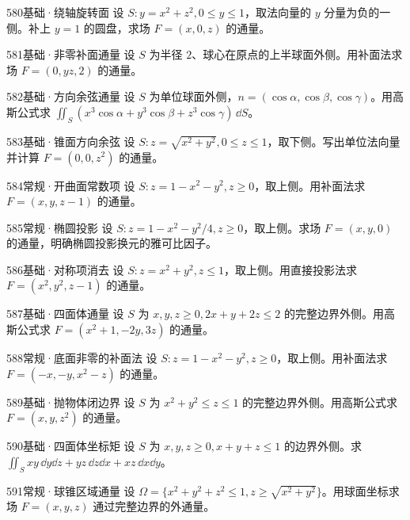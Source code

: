\begin{exercise}{580}{基础·绕轴旋转面}
设 $S:y=x^2+z^2,0\leq y\leq1$，取法向量的 $y$ 分量为负的一侧。补上 $y=1$ 的圆盘，求场 $F=(x,0,z)$ 的通量。
\end{exercise}
\begin{exercise}{581}{基础·非零补面通量}
设 $S$ 为半径 $2$、球心在原点的上半球面外侧。用补面法求场 $F=(0,yz,2)$ 的通量。
\end{exercise}
\begin{exercise}{582}{基础·方向余弦通量}
设 $S$ 为单位球面外侧，$n=(\cos\alpha,\cos\beta,\cos\gamma)$。用高斯公式求 $\iint_S(x^3\cos\alpha+y^3\cos\beta+z^3\cos\gamma)\,\dd S$。
\end{exercise}
\begin{exercise}{583}{基础·锥面方向余弦}
设 $S:z=\sqrt{x^2+y^2},0\leq z\leq1$，取下侧。写出单位法向量并计算 $F=(0,0,z^2)$ 的通量。
\end{exercise}
\begin{exercise}{584}{常规·开曲面常数项}
设 $S:z=1-x^2-y^2,z\geq0$，取上侧。用补面法求 $F=(x,y,z-1)$ 的通量。
\end{exercise}
\begin{exercise}{585}{常规·椭圆投影}
设 $S:z=1-x^2-y^2/4,z\geq0$，取上侧。求场 $F=(x,y,0)$ 的通量，明确椭圆投影换元的雅可比因子。
\end{exercise}
\begin{exercise}{586}{基础·对称项消去}
设 $S:z=x^2+y^2,z\leq1$，取上侧。用直接投影法求 $F=(x^2,y^2,z-1)$ 的通量。
\end{exercise}
\begin{exercise}{587}{基础·四面体通量}
设 $S$ 为 $x,y,z\geq0,2x+y+2z\leq2$ 的完整边界外侧。用高斯公式求 $F=(x^2+1,-2y,3z)$ 的通量。
\end{exercise}
\begin{exercise}{588}{常规·底面非零的补面法}
设 $S:z=1-x^2-y^2,z\geq0$，取上侧。用补面法求 $F=(-x,-y,x^2-z)$ 的通量。
\end{exercise}
\begin{exercise}{589}{基础·抛物体闭边界}
设 $S$ 为 $x^2+y^2\leq z\leq1$ 的完整边界外侧。用高斯公式求 $F=(x,y,z^2)$ 的通量。
\end{exercise}
\begin{exercise}{590}{基础·四面体坐标矩}
设 $S$ 为 $x,y,z\geq0,x+y+z\leq1$ 的边界外侧。求 $\iint_Sxy\,\dd y\dd z+yz\,\dd z\dd x+xz\,\dd x\dd y$。
\end{exercise}
\begin{exercise}{591}{常规·球锥区域通量}
设 $\Omega=\{x^2+y^2+z^2\leq1,z\geq\sqrt{x^2+y^2}\}$。用球面坐标求场 $F=(x,y,z)$ 通过完整边界的外通量。
\end{exercise}
